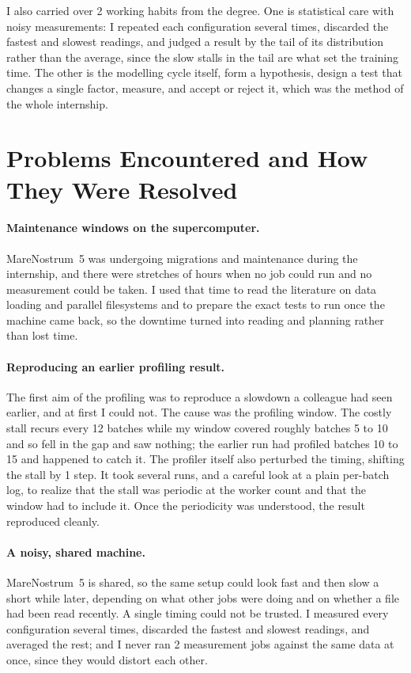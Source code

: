 \documentclass[12pt,a4paper]{article}
\begin{document}
I also carried over 2 working habits from the degree. One is statistical care with noisy
measurements: I repeated each configuration several times, discarded the fastest and slowest
readings, and judged a result by the tail of its distribution rather than the average, since the
slow stalls in the tail are what set the training time. The other is the modelling cycle itself,
form a hypothesis, design a test that changes a single factor, measure, and accept or reject it,
which was the method of the whole internship.

\section{Problems Encountered and How They Were Resolved}

\paragraph{Maintenance windows on the supercomputer.} MareNostrum~5 was undergoing migrations and
maintenance during the internship, and there were stretches of hours when no job could run and no
measurement could be taken. I used that time to read the literature on data loading and parallel
filesystems and to prepare the exact tests to run once the machine came back, so the downtime turned
into reading and planning rather than lost time.

\paragraph{Reproducing an earlier profiling result.} The first aim of the profiling was to reproduce
a slowdown a colleague had seen earlier, and at first I could not. The cause was the profiling
window. The costly stall recurs every 12 batches while my window covered roughly batches 5 to 10 and
so fell in the gap and saw nothing; the earlier run had profiled batches 10 to 15 and happened to
catch it. The profiler itself also perturbed the timing, shifting the stall by 1 step. It took
several runs, and a careful look at a plain per-batch log, to realize that the stall was periodic at
the worker count and that the window had to include it. Once the periodicity was understood, the
result reproduced cleanly.

\paragraph{A noisy, shared machine.} MareNostrum~5 is shared, so the same setup could look fast and
then slow a short while later, depending on what other jobs were doing and on whether a file had been
read recently. A single timing could not be trusted. I measured every configuration several times,
discarded the fastest and slowest readings, and averaged the rest; and I never ran 2 measurement
jobs against the same data at once, since they would distort each other.
\end{document}
